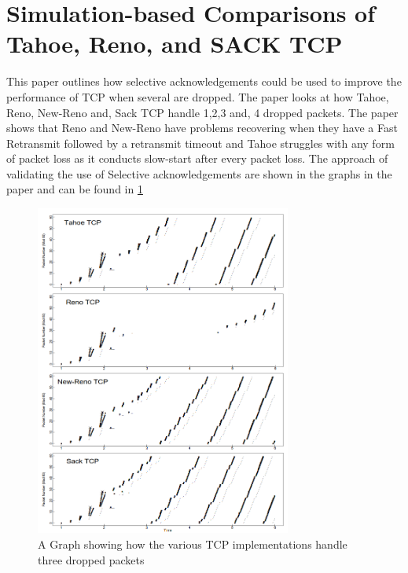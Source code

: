 \documentclass[a4paper,12pt]{scrartcl}
\begin{document}
	\section{Simulation-based Comparisons of Tahoe, Reno, and SACK TCP\cite{FallFloydTahoeRenoSack}}
	{
		This paper outlines how selective acknowledgements could be used to improve the performance of TCP when several are dropped. The paper looks at how Tahoe, Reno, New-Reno and, Sack TCP handle 1,2,3 and, 4 dropped packets. The paper shows that Reno and New-Reno have problems recovering when they have a Fast Retransmit followed by a retransmit timeout and Tahoe struggles with any form of packet loss as it conducts slow-start after every packet loss. The approach of validating the use of Selective acknowledgements are shown in the graphs in the paper\cite{FallFloydTahoeRenoSack} and can be found in \cref{fig:CoparisonOfTCPWith4DroppedPackets}
		\begin{figure}[h]
			\centering
			\includegraphics[width=0.75\textwidth]{CoparisonOfTCPWith4DroppedPackets}
			\caption{A Graph showing how the various TCP implementations handle three dropped packets\cite{FallFloydTahoeRenoSack}}
			\label{fig:CoparisonOfTCPWith4DroppedPackets}
		\end{figure}
	}
\end{document}
